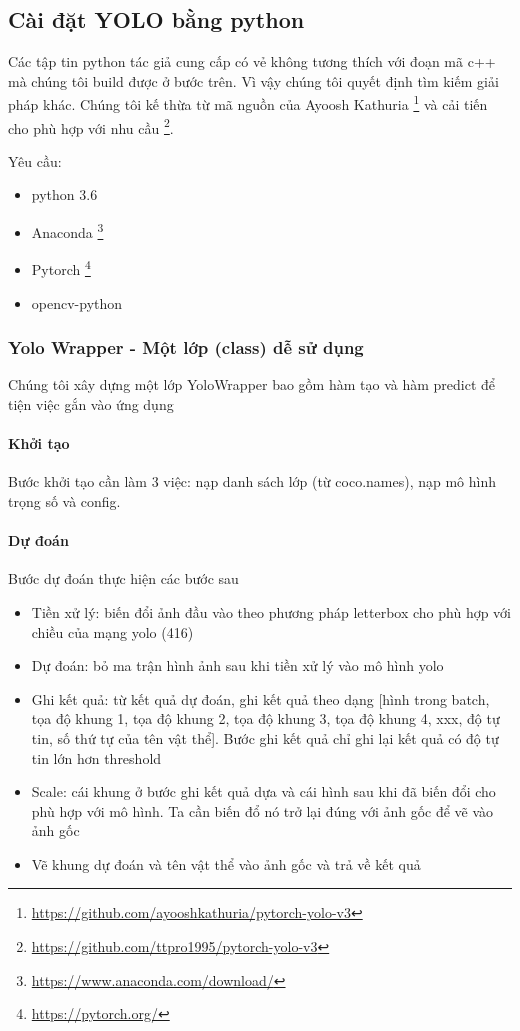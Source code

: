 \subsection{Cài đặt YOLO bằng python}

Các tập tin python tác giả cung cấp có vẻ không tương thích với đoạn mã c++ mà chúng tôi build được ở bước trên. Vì vậy chúng tôi quyết định tìm kiếm giải pháp khác. Chúng tôi kế thừa từ mã nguồn của Ayoosh Kathuria \footnote{\url{https://github.com/ayooshkathuria/pytorch-yolo-v3}} và cải tiến cho phù hợp với nhu cầu \footnote{\url{https://github.com/ttpro1995/pytorch-yolo-v3}}.  

Yêu cầu: 
\begin{itemize}
\item python 3.6
\item Anaconda \footnote{\url{https://www.anaconda.com/download/}}
\item Pytorch \footnote{\url{https://pytorch.org/}}
\item opencv-python 
\end{itemize}

\subsubsection{Yolo Wrapper - Một lớp (class) dễ sử dụng}

Chúng tôi xây dựng một lớp YoloWrapper bao gồm hàm tạo và hàm predict để tiện việc gắn vào ứng dụng 

\paragraph{Khởi tạo}
Bước khởi tạo cần làm 3 việc: nạp danh sách lớp (từ coco.names), nạp mô hình trọng số và config. 

\paragraph{Dự đoán}
Bước dự đoán thực hiện các bước sau 

\begin{itemize}
\item Tiền xử lý: biến đổi ảnh đầu vào theo phương pháp letterbox cho phù hợp với chiều của mạng yolo (416) 
\item Dự đoán: bỏ ma trận hình ảnh sau khi tiền xử lý vào mô hình yolo 
\item Ghi kết quả: từ kết quả dự đoán, ghi kết quả theo dạng [hình trong batch, tọa độ khung 1, tọa độ khung 2, tọa độ khung 3, tọa độ khung 4, xxx, độ tự tin, số thứ tự của tên vật thể]. Bước ghi kết quả chỉ ghi lại kết quả có độ tự tin lớn hơn threshold 
\item Scale: cái khung ở bước ghi kết quả dựa và cái hình sau khi đã biến đổi cho phù hợp với mô hình. Ta cần biến đổ nó trở lại đúng với ảnh gốc để vẽ vào ảnh gốc 
\item Vẽ khung dự đoán và tên vật thể vào ảnh gốc và trả về kết quả 
\end{itemize} 


